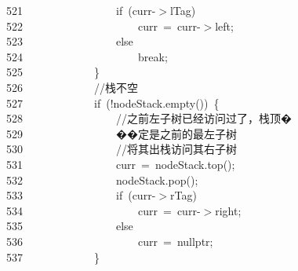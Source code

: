 \documentclass[11pt,a4paper]{ctexart}
\newcommand{\hlstd}[1]{\textcolor[rgb]{0.2,0.2,0.2}{#1}}
\newcommand{\hlslc}[1]{\textcolor[rgb]{0.59,0.59,0.59}{#1}}
\newcommand{\hlopt}[1]{\textcolor[rgb]{0.2,0.2,0.2}{#1}}
\newcommand{\hllin}[1]{\textcolor[rgb]{0.59,0.59,0.59}{#1}}
\newcommand{\hlkwa}[1]{\textcolor[rgb]{0.23,0.42,0.78}{#1}}
\newcommand{\hlkwc}[1]{\textcolor[rgb]{0,0.63,0.31}{#1}}
\newcommand{\hlkwd}[1]{\textcolor[rgb]{0.78,0.23,0.41}{#1}}
\begin{document}
\hllin{521\ }\hlstd{}\hlstd{\ \ \ \ \ \ \ \ \ \ \ \ \ \ \ \ }\hlstd{}\hlkwa{if\ }\hlstd{}\hlopt{(}\hlstd{curr}\hlopt{{-}$>$}\hlstd{lTag}\hlopt{)}\\
\hllin{522\ }\hlstd{}\hlstd{\ \ \ \ \ \ \ \ \ \ \ \ \ \ \ \ \ \ \ \ }\hlstd{curr\ }\hlopt{=\ }\hlstd{curr}\hlopt{{-}$>$}\hlstd{left}\hlopt{;}\\
\hllin{523\ }\hlstd{}\hlstd{\ \ \ \ \ \ \ \ \ \ \ \ \ \ \ \ }\hlstd{}\hlkwa{else}\\
\hllin{524\ }\hlstd{}\hlstd{\ \ \ \ \ \ \ \ \ \ \ \ \ \ \ \ \ \ \ \ }\hlstd{}\hlkwa{break}\hlstd{}\hlopt{;}\\
\hllin{525\ }\hlstd{}\hlstd{\ \ \ \ \ \ \ \ \ \ \ \ }\hlstd{}\hlopt{\}}\\
\hllin{526\ }\hlstd{}\hlstd{\ \ \ \ \ \ \ \ \ \ \ \ }\hlstd{}\hlslc{//栈不空}\\
\hllin{527\ }\hlstd{}\hlstd{\ \ \ \ \ \ \ \ \ \ \ \ }\hlstd{}\hlkwa{if\ }\hlstd{}\hlopt{(!}\hlstd{nodeStack}\hlopt{.}\hlstd{}\hlkwd{empty}\hlstd{}\hlopt{())\ \{}\\
\hllin{528\ }\hlstd{}\hlstd{\ \ \ \ \ \ \ \ \ \ \ \ \ \ \ \ }\hlstd{}\hlslc{//之前左子树已经访问过了，栈顶�}\Righttorque\\
\hllin{529\ }\hlslc{}\hlstd{\ \ \ \ \ \ \ \ \ \ \ \ \ \ \ \ }\hlslc{��定是之前的最左子树}\\
\hllin{530\ }\hlstd{}\hlstd{\ \ \ \ \ \ \ \ \ \ \ \ \ \ \ \ }\hlstd{}\hlslc{//将其出栈访问其右子树}\\
\hllin{531\ }\hlstd{}\hlstd{\ \ \ \ \ \ \ \ \ \ \ \ \ \ \ \ }\hlstd{curr\ }\hlopt{=\ }\hlstd{nodeStack}\hlopt{.}\hlstd{}\hlkwd{top}\hlstd{}\hlopt{();}\\
\hllin{532\ }\hlstd{}\hlstd{\ \ \ \ \ \ \ \ \ \ \ \ \ \ \ \ }\hlstd{nodeStack}\hlopt{.}\hlstd{}\hlkwd{pop}\hlstd{}\hlopt{();}\\
\hllin{533\ }\hlstd{}\hlstd{\ \ \ \ \ \ \ \ \ \ \ \ \ \ \ \ }\hlstd{}\hlkwa{if\ }\hlstd{}\hlopt{(}\hlstd{curr}\hlopt{{-}$>$}\hlstd{rTag}\hlopt{)}\\
\hllin{534\ }\hlstd{}\hlstd{\ \ \ \ \ \ \ \ \ \ \ \ \ \ \ \ \ \ \ \ }\hlstd{curr\ }\hlopt{=\ }\hlstd{curr}\hlopt{{-}$>$}\hlstd{right}\hlopt{;}\\
\hllin{535\ }\hlstd{}\hlstd{\ \ \ \ \ \ \ \ \ \ \ \ \ \ \ \ }\hlstd{}\hlkwa{else}\\
\hllin{536\ }\hlstd{}\hlstd{\ \ \ \ \ \ \ \ \ \ \ \ \ \ \ \ \ \ \ \ }\hlstd{curr\ }\hlopt{=\ }\hlstd{}\hlkwc{nullptr}\hlstd{}\hlopt{;}\\
\hllin{537\ }\hlstd{}\hlstd{\ \ \ \ \ \ \ \ \ \ \ \ }\hlstd{}\hlopt{\}}\\
\end{document}
